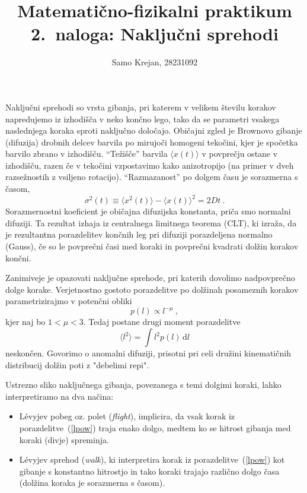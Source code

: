 \documentclass[slovene,11pt,a4paper]{article}
\title{
\sc\large Matematično-fizikalni praktikum \thisyear\\
\bigskip
\bf\Large 2.~naloga: Naključni sprehodi
}
\author{Samo Krejan, 28231092}
\date{}
\newcommand{\dd}{\,\mathrm{d}}
\begin{document}
\maketitle

Naključni sprehodi so vrsta gibanja, pri katerem
v velikem številu korakov napredujemo iz izhodišča
v neko končno lego, tako da se parametri vsakega naslednjega
koraka sproti naključno določajo.  Običajni zgled
je Brownovo gibanje (difuzija) drobnih delcev barvila
po mirujoči homogeni tekočini, kjer je spočetka barvilo
zbrano v izhodišču.  ``Težišče'' barvila
$\langle x(t)\rangle$ v povprečju ostane v izhodišču,
razen če v tekočini vzpostavimo kako anizotropijo (na primer
v dveh razsežnostih z vsiljeno rotacijo).  ``Razmazanost''
po dolgem času je sorazmerna s časom,
\begin{equation*}
  \sigma^2(t) \equiv \langle x^2(t)\rangle - \langle x(t)\rangle^2 = 2 D t \>.
\end{equation*}
Sorazmernostni koeficient je običajna difuzijska konstanta,
priča smo normalni difuziji.  Ta rezultat izhaja iz
centralnega limitnega teorema (CLT), ki izraža,
da je rezultantna porazdelitev končnih leg pri difuziji
porazdeljena normalno (Gauss), če so le povprečni časi
med koraki in povprečni kvadrati dolžin korakov končni.

Zanimiveje je opazovati naključne sprehode, pri katerih dovolimo
nadpovprečno dolge korake.  Verjetnostno gostoto porazdelitve
po dolžinah posameznih korakov parametrizirajmo v potenčni obliki
\begin{equation}
p(l) \propto l^{-\mu} \>,
\label{lpow}
\end{equation}
kjer naj bo $1 < \mu < 3$.  Tedaj postane drugi moment porazdelitve
\begin{equation*}
  \langle l^2\rangle = \int l^2 p(l) \dd l
\end{equation*}
neskončen.  Govorimo o anomalni difuziji, prisotni pri celi dru\v zini
kinematičnih distribucij dolžin poti z "debelimi repi".

Ustrezno sliko naključnega gibanja, povezanega s temi dolgimi koraki, lahko
interpretiramo na dva načina:
\begin{itemize}
  \item L\'evyjev pobeg oz. polet ({\sl flight\/}), implicira, da vsak korak iz
  porazdelitve~(\ref{lpow}) traja enako dolgo, medtem ko se hitrost gibanja med koraki (divje) spreminja.
  \item L\'evyjev sprehod ({\sl walk\/}), ki interpretira korak iz porazdelitve~(\ref{lpow}) kot  gibanje s konstantno hitrostjo in
  tako koraki trajajo različno dolgo časa (dolžina koraka je sorazmerna s časom).
\end{itemize}
\end{document}
